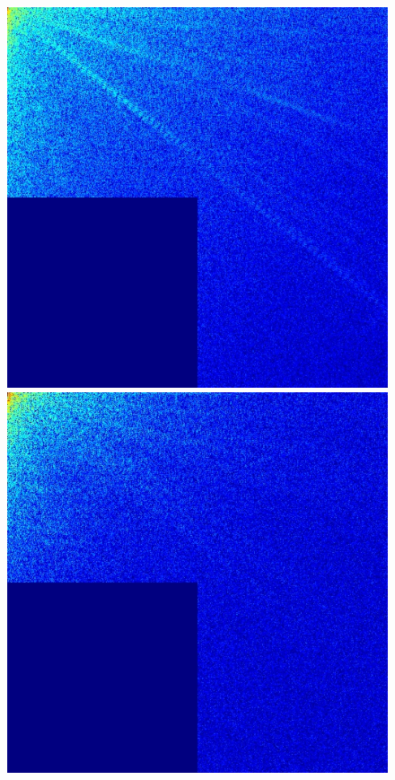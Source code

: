 \documentclass[12pt]{report}
\begin{document}
\begin{figure}[H]
\begin{center}
\includegraphics[scale=0.25]{../ImageRes/dct_masked3_0.jpg} 
\includegraphics[scale=0.25]{../ImageRes/dct_masked3_1.jpg} 

\end{center}
\end{figure}
\end{document}
